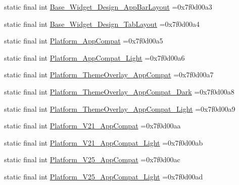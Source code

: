 \begin{DoxyCompactItemize}
static final int \mbox{\hyperlink{classcom_1_1example_1_1trainawearapplication_1_1_r_1_1style_a13ae8a556af785120d8c048a2e9b3bb0}{Base\+\_\+\+Widget\+\_\+\+Design\+\_\+\+App\+Bar\+Layout}} =0x7f0d00a3
\item 
static final int \mbox{\hyperlink{classcom_1_1example_1_1trainawearapplication_1_1_r_1_1style_a5cafed0391d69a347f98ce0ed486a144}{Base\+\_\+\+Widget\+\_\+\+Design\+\_\+\+Tab\+Layout}} =0x7f0d00a4
\item 
static final int \mbox{\hyperlink{classcom_1_1example_1_1trainawearapplication_1_1_r_1_1style_ab25b2b3c512c82ceb067fcc05dd2fd79}{Platform\+\_\+\+App\+Compat}} =0x7f0d00a5
\item 
static final int \mbox{\hyperlink{classcom_1_1example_1_1trainawearapplication_1_1_r_1_1style_ab1fdd73761b70ae6170d55d1d2afefa1}{Platform\+\_\+\+App\+Compat\+\_\+\+Light}} =0x7f0d00a6
\item 
static final int \mbox{\hyperlink{classcom_1_1example_1_1trainawearapplication_1_1_r_1_1style_a8cbca2b4c7ff301372880ca3cc402fa7}{Platform\+\_\+\+Theme\+Overlay\+\_\+\+App\+Compat}} =0x7f0d00a7
\item 
static final int \mbox{\hyperlink{classcom_1_1example_1_1trainawearapplication_1_1_r_1_1style_a1b57146929ca3d9e19b6cb1df0e77ef8}{Platform\+\_\+\+Theme\+Overlay\+\_\+\+App\+Compat\+\_\+\+Dark}} =0x7f0d00a8
\item 
static final int \mbox{\hyperlink{classcom_1_1example_1_1trainawearapplication_1_1_r_1_1style_abd53c97badfea5200e1b36ffd683f94d}{Platform\+\_\+\+Theme\+Overlay\+\_\+\+App\+Compat\+\_\+\+Light}} =0x7f0d00a9
\item 
static final int \mbox{\hyperlink{classcom_1_1example_1_1trainawearapplication_1_1_r_1_1style_a0ab5a990ab5dd581c1903408f3e85f0c}{Platform\+\_\+\+V21\+\_\+\+App\+Compat}} =0x7f0d00aa
\item 
static final int \mbox{\hyperlink{classcom_1_1example_1_1trainawearapplication_1_1_r_1_1style_ab39dc9651bc064f51d1dfc99ed5a03cf}{Platform\+\_\+\+V21\+\_\+\+App\+Compat\+\_\+\+Light}} =0x7f0d00ab
\item 
static final int \mbox{\hyperlink{classcom_1_1example_1_1trainawearapplication_1_1_r_1_1style_ae281f2491c27a6948aea69f5664d145e}{Platform\+\_\+\+V25\+\_\+\+App\+Compat}} =0x7f0d00ac
\item 
static final int \mbox{\hyperlink{classcom_1_1example_1_1trainawearapplication_1_1_r_1_1style_a741fe08b0b904a3f3fc9f06cbc0078f2}{Platform\+\_\+\+V25\+\_\+\+App\+Compat\+\_\+\+Light}} =0x7f0d00ad
\item 

\end{DoxyCompactItemize}
